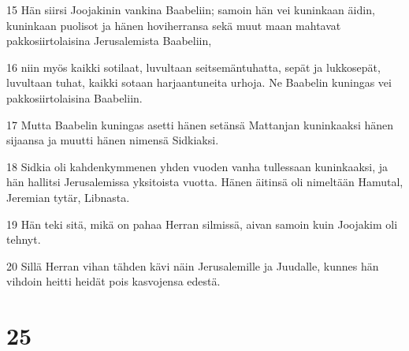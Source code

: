 \par 15 Hän siirsi Joojakinin vankina Baabeliin; samoin hän vei kuninkaan äidin, kuninkaan puolisot ja hänen hoviherransa sekä muut maan mahtavat pakkosiirtolaisina Jerusalemista Baabeliin,
\par 16 niin myös kaikki sotilaat, luvultaan seitsemäntuhatta, sepät ja lukkosepät, luvultaan tuhat, kaikki sotaan harjaantuneita urhoja. Ne Baabelin kuningas vei pakkosiirtolaisina Baabeliin.
\par 17 Mutta Baabelin kuningas asetti hänen setänsä Mattanjan kuninkaaksi hänen sijaansa ja muutti hänen nimensä Sidkiaksi.
\par 18 Sidkia oli kahdenkymmenen yhden vuoden vanha tullessaan kuninkaaksi, ja hän hallitsi Jerusalemissa yksitoista vuotta. Hänen äitinsä oli nimeltään Hamutal, Jeremian tytär, Libnasta.
\par 19 Hän teki sitä, mikä on pahaa Herran silmissä, aivan samoin kuin Joojakim oli tehnyt.
\par 20 Sillä Herran vihan tähden kävi näin Jerusalemille ja Juudalle, kunnes hän vihdoin heitti heidät pois kasvojensa edestä.

\chapter{25}

